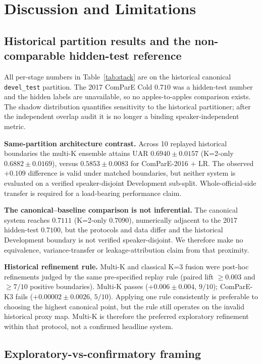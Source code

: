 \section{Discussion and Limitations}
\label{sec:disc}

\subsection{Historical partition results and the non-comparable hidden-test reference}
\label{ssec:shadow_first}

All per-stage numbers in Table~\ref{tab:stack} are on the historical canonical
\texttt{devel\_test} partition. The 2017 ComParE Cold $0.710$ was a hidden-test
number and the hidden labels are unavailable, so no apples-to-apples comparison
exists. The shadow distribution quantifies sensitivity to the historical
partitioner; after the independent overlap audit it is no longer a binding
speaker-independent metric.

\textbf{Same-partition architecture contrast.} Across 10 replayed historical boundaries the multi-K ensemble attains UAR $0.6940 \pm 0.0157$ (K=2-only $0.6882 \pm 0.0169$), versus $0.5853 \pm 0.0083$ for ComParE-2016 $+$ LR. The observed $+0.109$ difference is valid under matched boundaries, but neither system is evaluated on a verified speaker-disjoint Development sub-split. Whole-official-side transfer is required for a load-bearing performance claim.

\textbf{The canonical--baseline comparison is not inferential.} The canonical system reaches $0.7111$ (K=2-only $0.7090$), numerically adjacent to the 2017 hidden-test $0.7100$, but the protocols and data differ and the historical Development boundary is not verified speaker-disjoint. We therefore make no equivalence, variance-transfer or leakage-attribution claim from that proximity.

\textbf{Historical refinement rule.} Multi-K and classical K=3 fusion were post-hoc refinements judged by the same pre-specified replay rule (paired lift $\geq0.003$ and $\geq7/10$ positive boundaries). Multi-K passes ($+0.006 \pm 0.004$, $9/10$); ComParE-K3 fails ($+0.00002 \pm 0.0026$, $5/10$). Applying one rule consistently is preferable to choosing the highest canonical point, but the rule still operates on the invalid historical proxy map. Multi-K is therefore the preferred exploratory refinement within that protocol, not a confirmed headline system.

\subsection{Exploratory-vs-confirmatory framing}

